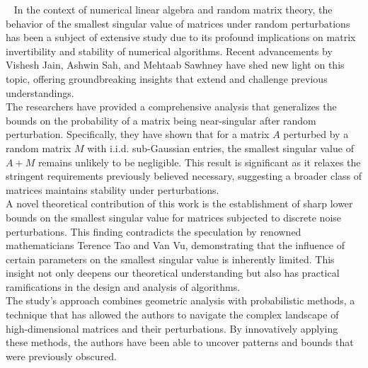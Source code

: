 
~\cite{jain2022smoothed}
In the context of numerical linear algebra and random matrix theory, the behavior of the smallest singular value of matrices under random perturbations has been a subject of extensive study due to its profound implications on matrix invertibility and stability of numerical algorithms. Recent advancements by Vishesh Jain, Ashwin Sah, and Mehtaab Sawhney have shed new light on this topic, offering groundbreaking insights that extend and challenge previous understandings.\\\newline
The researchers have provided a comprehensive analysis that generalizes the bounds on the probability of a matrix being near-singular after random perturbation. Specifically, they have shown that for a matrix ${A}$ perturbed by a random matrix 
${M}$ with i.i.d. sub-Gaussian entries, the smallest singular value of ${A+M}$ remains unlikely to be negligible. This result is significant as it relaxes the stringent requirements previously believed necessary, suggesting a broader class of matrices maintains stability under perturbations.\\\newline
A novel theoretical contribution of this work is the establishment of sharp lower bounds on the smallest singular value for matrices subjected to discrete noise perturbations. This finding contradicts the speculation by renowned mathematicians Terence Tao and Van Vu, demonstrating that the influence of certain parameters on the smallest singular value is inherently limited. This insight not only deepens our theoretical understanding but also has practical ramifications in the design and analysis of algorithms.\\\newline
The study's approach combines geometric analysis with probabilistic methods, a technique that has allowed the authors to navigate the complex landscape of high-dimensional matrices and their perturbations. By innovatively applying these methods, the authors have been able to uncover patterns and bounds that were previously obscured.
